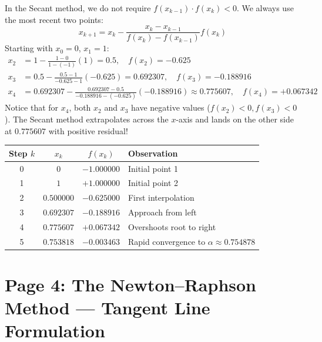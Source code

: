 \begin{examplebox}
In the Secant method, we do not require $f(x_{k-1}) \cdot f(x_k) < 0$. We always use the most recent two points:
\begin{equation}
    x_{k+1} = x_k - \frac{x_k - x_{k-1}}{f(x_k) - f(x_{k-1})} f(x_k)
\end{equation}
Starting with $x_0 = 0$, $x_1 = 1$:
\begin{align}
    x_2 &= 1 - \frac{1 - 0}{1 - (-1)}(1) = 0.5, \quad f(x_2) = -0.625 \\
    x_3 &= 0.5 - \frac{0.5 - 1}{-0.625 - 1}(-0.625) = 0.692307, \quad f(x_3) = -0.188916 \\
    x_4 &= 0.692307 - \frac{0.692307 - 0.5}{-0.188916 - (-0.625)}(-0.188916) \approx 0.775607, \quad f(x_4) = +0.067342
\end{align}
Notice that for $x_4$, both $x_2$ and $x_3$ have negative values ($f(x_2) < 0, f(x_3) < 0$). The Secant method extrapolates across the $x$-axis and lands on the other side at $0.775607$ with positive residual!

\begin{center}
\small
\renewcommand{\arraystretch}{1.2}
\begin{tabular}{|c|c|c|l|}
\hline
\textbf{Step $k$} & $x_k$ & $f(x_k)$ & \textbf{Observation} \\
\hline
0 & $0$ & $-1.000000$ & Initial point 1 \\
1 & $1$ & $+1.000000$ & Initial point 2 \\
2 & $0.500000$ & $-0.625000$ & First interpolation \\
3 & $0.692307$ & $-0.188916$ & Approach from left \\
4 & $0.775607$ & $+0.067342$ & Overshoots root to right \\
5 & $0.753818$ & $-0.003463$ & Rapid convergence to $\alpha \approx 0.754878$ \\
\hline
\end{tabular}
\end{center}
\end{examplebox}

\section{Page 4: The Newton--Raphson Method --- Tangent Line Formulation}
\label{sec:page4_newton_raphson}

